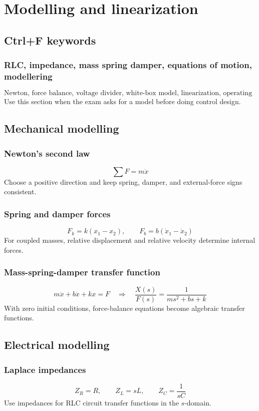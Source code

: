 \section{Modelling and linearization}

\subsection{Ctrl+F keywords}

\subsubsection{RLC, impedance, mass spring damper, equations of motion, modellering}
\[
\text{Newton, force balance, voltage divider, white-box model, linearization, operating point}
\]
Use this section when the exam asks for a model before doing control design.

\subsection{Mechanical modelling}

\subsubsection{Newton's second law}
\[
\sum F=m\ddot{x}
\]
Choose a positive direction and keep spring, damper, and external-force signs consistent.

\subsubsection{Spring and damper forces}
\[
F_k=k(x_1-x_2),\qquad F_b=b(\dot{x}_1-\dot{x}_2)
\]
For coupled masses, relative displacement and relative velocity determine internal forces.

\subsubsection{Mass-spring-damper transfer function}
\[
m\ddot{x}+b\dot{x}+kx=F
\quad\Longrightarrow\quad
\frac{X(s)}{F(s)}=\frac{1}{ms^2+bs+k}
\]
With zero initial conditions, force-balance equations become algebraic transfer functions.

\subsection{Electrical modelling}

\subsubsection{Laplace impedances}
\[
Z_R=R,\qquad Z_L=sL,\qquad Z_C=\frac{1}{sC}
\]
Use impedances for RLC circuit transfer functions in the \(s\)-domain.


